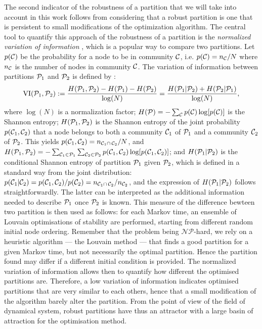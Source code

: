 \begin{sloppypar} 
The second indicator of the robustness of a partition that we will take into account in this work follows from considering that a robust partition is one that is persistent to small modifications of the optimization algorithm. The central tool to quantify this approach of the robustness of a partition is the \textit{normalized variation of information} \cite{meilua2007comparing}, which is a popular way to compare two partitions. Let $p(\C)$ be the probability for a node to be in community $\C$, i.e. $p(\C) = n_\C/N$ where $n_\C$ is the number of nodes in community $\C$. The variation of information between partitions $\P_1$ and $\P_2$ is defined by :
\begin{equation} \label{eq:clustering_VI}
	\VI(\P_1,\P_2) := \frac{H(\P_1,\P_2)-H(\P_1)-H(\P_2)}{\log (N)} = \frac{H(\P_1|\P_2)+H(\P_2|\P_1)}{\log (N)},
\end{equation}
where $\log(N)$ is a normalization factor; $H(\P) = -\sum_{\C} p(\C) \log[p(\C)]$ is the Shannon entropy; $H(\P_1,\P_2)$ is the Shannon entropy of the joint probability $p(\C_1,\C_2)$ that a node belongs to both a community $\C_1$ of $\P_1$ and a community $\C_2$ of $\P_2$. This yields $p(\C_1,\C_2) = n_{\C_1 \cap\, \C_2}/N$, and $H(\P_1,\P_2) = -\sum_{\C_1 \in \P_1} \sum_{\C_2 \in \P_2} p(\C_1,\C_2) \log[p(\C_1,\C_2)]$; and $H(\P_1|\P_2)$ is the conditional Shannon entropy of partition $\P_1$ given $\P_2$, which is defined in a standard way from the joint distribution: $p(\C_1|\C_2) = p(\C_1,\C_2)/p(\C_2) = n_{\C_1\cap\, \C_2}/n_{\C_2}$, and the expression of $H(\P_1|\P_2)$ follows straightforwardly. The latter can be interpreted as the additional information needed to describe $\P_1$ once $\P_2$ is known. This measure of the difference bewteen two partition is then used as follows: for each Markov time, an ensemble of Louvain optimisations of stability are performed, starting from different random initial node ordering. Remember that the problem being $\mathcal{NP}$-hard, we rely on a heuristic algorithm --- the Louvain method --- that finds a good partition for a given Markov time, but not necessarily the optimal partition. Hence the partition found may differ if a different initial condition is provided. The normalized variation of information allows then to quantify how different the optimised partitions are. Therefore, a low variation of information indicates optimised partitions that are very similar to each others, hence that a small modification of the algorithm barely alter the partition. From the point of view of the field of dynamical system, robust partitions have thus an attractor with a large basin of attraction for the optimisation method. 
\end{sloppypar}



